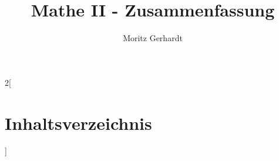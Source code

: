 \documentclass[
ngerman,
color=3b,
boxarc,
main,
tikz,
border=3mm
]{article}
\title{Mathe II - Zusammenfassung} %
\author{Moritz Gerhardt } %
\date{} %
\begin{document}
\maketitle
\thispagestyle{fancy}

\begin{multicols*}{2}[
\section{Inhaltsverzeichnis}
]
\tableofcontents
\end{multicols*}
\newpage



\newpage



\newpage


\end{document}

